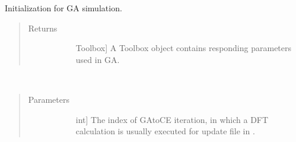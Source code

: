 \documentclass[letterpaper,10pt,english]{sphinxmanual}
\begin{document}
\begin{fulllineitems}
\begin{fulllineitems}
\begin{quote}
\begin{description}
\begin{description}
\end{description}

\end{description}\end{quote}

\end{fulllineitems}


\begin{fulllineitems}
\label{\detokenize{pygace:pygace.gace.AbstractApp.initial}}
\sphinxAtStartPar
Initialization for GA simulation.
\begin{quote}\begin{description}
\item[{Returns}] \leavevmode\begin{description}
\item[{}] \leavevmode{[}Toolbox{]}
\sphinxAtStartPar
A Toolbox object contains responding parameters used in GA.

\end{description}

\end{description}\end{quote}

\end{fulllineitems}


\begin{fulllineitems}
\label{\detokenize{pygace:pygace.gace.AbstractApp.run}}~\begin{quote}\begin{description}
\item[{Parameters}] \leavevmode\begin{description}
\item[{}] \leavevmode{[}int{]}
\sphinxAtStartPar
The index of GA\sphinxhyphen{}to\sphinxhyphen{}CE iteration, in which a DFT calculation is
usually executed for update  file in .


\end{description}
\end{description}
\end{quote}
\end{fulllineitems}
\end{fulllineitems}
\end{document}
